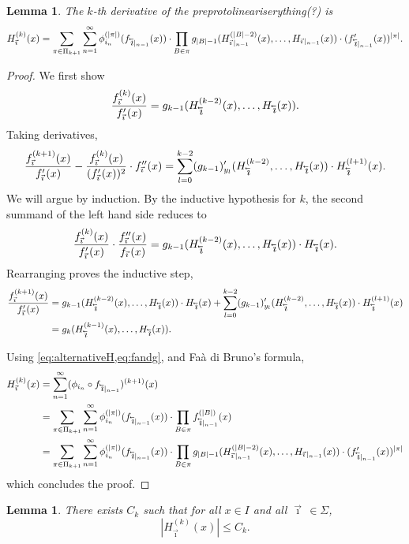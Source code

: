 \documentclass[12pt,]{article}
\newtheorem{lemma}[theorem]{Lemma}
\theoremstyle{definition}
\theoremstyle{remark}
\newcommand{\0}{\mathbf{0}}
\newcommand{\cev}[1]{\reflectbox{\ensuremath{\vec{\reflectbox{\ensuremath{#1}}}}}}
\newcommand{\bi}{\vec{\imath}\,}
\newcommand{\bbi}{\,\cev{\imath}}
\begin{document}
\begin{lemma}
  \label{thm:ugly}
  The $k$-th derivative of the preprotolineariserything(?) is
  \[
  H_{\bi}^{(k)}(x) 
  =\sum_{\pi\in\Pi_{k+1}} \sum_{n=1}^\infty \phi_{i_n}^{(|\pi|)}(f_{\bbi|_{n-1}}(x))\cdot
  \prod_{B\in\pi}
  g_{|B|-1}(H_{\bi|_{n-1}}^{(|B|-2)}(x),\dots,H_{\bi|_{n-1}}(x))\cdot(f'_{\bbi|_{n-1}}(x))^{|\pi|}.
  \]
\end{lemma}
\begin{proof}
  We first show
  \begin{equation}
    \label{eq:fandg}
    \frac{f_{\bi}^{(k)}(x)}{f_{\bi}'(x)}
    =
    g_{k-1}(H_{\bbi}^{(k-2)}(x), \dots, H_{\bbi}(x)).
  \end{equation}
  Taking derivatives,
  \[
    \frac{f_{\bi}^{(k+1)}(x)}{f_{\bi}'(x)} - \frac{f_{\bi}^{(k)}(x)}{(f_{\bi}'(x))^2}\cdot f_{\bi}''(x)
    =\sum_{l=0}^{k-2}(g_{k-1})'_{y_l}(H_{\bbi}^{(k-2)},\dots,H_{\bbi}(x)) \cdot H_{\bbi}^{(l+1)}(x).
  \]
  We will argue by induction. By the inductive hypothesis for $k$, the second summand of the left hand
  side reduces to
  \[
    \frac{f_{\bi}^{(k)}(x)}{f_{\bi}'(x)}\cdot \frac{f_{\bi}''(x)}{f_{\bi}(x)}
    =g_{k-1}(H_{\bbi}^{(k-2)}(x),\dots, H_{\bbi}(x)) \cdot H_{\bbi}(x).
  \]
  Rearranging proves the inductive step,
  \begin{align*}
    \frac{f_{\bi}^{(k+1)}(x)}{f_{\bi}'(x)}
  &=
  g_{k-1}(H_{\bbi}^{(k-2)}(x),\dots, H_{\bbi}(x)) \cdot H_{\bbi}(x)
  +
  \sum_{l=0}^{k-2}(g_{k-1})'_{y_l}(H_{\bbi}^{(k-2)},\dots,H_{\bbi}(x)) \cdot H_{\bbi}^{(l+1)}(x)
  \\
  &=
  g_{k}(H_{\bbi}^{(k-1)}(x), \dots, H_{\bbi}(x)).
  \end{align*}

Using \cref{eq:alternativeH,eq:fandg}, and Fa\`a di Bruno's formula,
\begin{align}
  H_{\bi}^{(k)}(x) 
  &=\sum_{n=1}^\infty (\phi_{i_n}\circ f_{\bbi|_{n-1}})^{(k+1)}(x) \nonumber\\
  &=\sum_{\pi\in\Pi_{k+1}} \sum_{n=1}^\infty \phi_{i_n}^{(|\pi|)}(f_{\bbi|_{n-1}}(x))\cdot
  \prod_{B\in\pi} f_{\bbi|_{n-1}}^{(|B|)}(x)\nonumber\\
  &=\sum_{\pi\in\Pi_{k+1}} \sum_{n=1}^\infty \phi_{i_n}^{(|\pi|)}(f_{\bbi|_{n-1}}(x))\cdot
  \prod_{B\in\pi}
  g_{|B|-1}(H_{\bi|_{n-1}}^{(|B|-2)}(x),\dots,H_{\bi|_{n-1}}(x))\cdot(f'_{\bbi|_{n-1}}(x))^{|\pi|}\nonumber
\end{align}
which concludes the proof.
\end{proof}
\begin{lemma}\label{thm:kbound}
  There exists $C_k$ such that for all $x\in I$ and all $\bi\in\Sigma$,
  \[
    |H_{\bi}^{(k)}(x)|\leq C_k.
  \]
\end{lemma}
\end{document}
